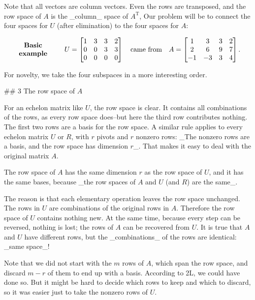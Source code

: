 Note that all vectors are column vectors. Even the rows are transposed, and the row space of \(A\) is the _column_ space of \(A^{\mathrm{T}}\), Our problem will be to connect the four spaces for \(U\) (after elimination) to the four spaces for \(A\):

\[\begin{array}{c}\mbox{\bf Basic}\\ \mbox{\bf example}\end{array}\qquad U=\begin{bmatrix}1&3&3&2\\ 0&0&3&3\\ 0&0&0&0\end{bmatrix}\quad\mbox{\rm came from}\quad A=\begin{bmatrix}1&3&3&2 \\ 2&6&9&7\\ -1&-3&3&4\end{bmatrix}.\]

For novelty, we take the four subspaces in a more interesting order.

## 3 The row space of \(A\)

For an echelon matrix like \(U\), the row space is clear. It contains all combinations of the rows, as every row space does--but here the third row contributes nothing. The first two rows are a basis for the row space. A similar rule applies to every echelon matrix \(U\) or \(R\), with \(r\) pivots and \(r\) nonzero rows: _The nonzero rows are a basis, and the row space has dimension \(r\)_. That makes it easy to deal with the original matrix \(A\).

The row space of \(A\) has the same dimension \(r\) as the row space of \(U\), and it has the same bases, because _the row spaces of \(A\) and \(U\) (and \(R\)) are the same_.

The reason is that each elementary operation leaves the row space unchanged. The rows in \(U\) are combinations of the original rows in \(A\). Therefore the row space of \(U\) contains nothing new. At the same time, because every step can be reversed, nothing is lost; the rows of \(A\) can be recovered from \(U\). It is true that \(A\) and \(U\) have different rows, but the _combinations_ of the rows are identical: _same space_!

Note that we did not start with the \(m\) rows of \(A\), which span the row space, and discard \(m-r\) of them to end up with a basis. According to 2L, we could have done so. But it might be hard to decide which rows to keep and which to discard, so it was easier just to take the nonzero rows of \(U\).

